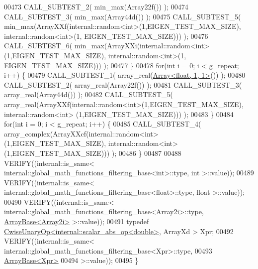 \begin{DoxyCode}
00473     CALL\_SUBTEST\_2( min\_max(Array22f()) );
00474     CALL\_SUBTEST\_3( min\_max(Array44d()) );
00475     CALL\_SUBTEST\_5( min\_max(ArrayXXf(internal::random<int>(1,EIGEN\_TEST\_MAX\_SIZE), internal::random<int>(1,
      EIGEN\_TEST\_MAX\_SIZE))) );
00476     CALL\_SUBTEST\_6( min\_max(ArrayXXi(internal::random<int>(1,EIGEN\_TEST\_MAX\_SIZE), internal::random<int>(1,
      EIGEN\_TEST\_MAX\_SIZE))) );
00477   \}
00478   \textcolor{keywordflow}{for}(\textcolor{keywordtype}{int} i = 0; i < g\_repeat; i++) \{
00479     CALL\_SUBTEST\_1( array\_real(\hyperlink{group___core___module_class_eigen_1_1_array}{Array<float, 1, 1>}()) );
00480     CALL\_SUBTEST\_2( array\_real(Array22f()) );
00481     CALL\_SUBTEST\_3( array\_real(Array44d()) );
00482     CALL\_SUBTEST\_5( array\_real(ArrayXXf(internal::random<int>(1,EIGEN\_TEST\_MAX\_SIZE), internal::random<int>
      (1,EIGEN\_TEST\_MAX\_SIZE))) );
00483   \}
00484   \textcolor{keywordflow}{for}(\textcolor{keywordtype}{int} i = 0; i < g\_repeat; i++) \{
00485     CALL\_SUBTEST\_4( array\_complex(ArrayXXcf(internal::random<int>(1,EIGEN\_TEST\_MAX\_SIZE), 
      internal::random<int>(1,EIGEN\_TEST\_MAX\_SIZE))) );
00486   \}
00487 
00488   VERIFY((internal::is\_same< internal::global\_math\_functions\_filtering\_base<int>::type, \textcolor{keywordtype}{int} >::value));
00489   VERIFY((internal::is\_same< internal::global\_math\_functions\_filtering\_base<float>::type, \textcolor{keywordtype}{float} >::value));
00490   VERIFY((internal::is\_same< internal::global\_math\_functions\_filtering\_base<Array2i>::type, 
      \hyperlink{group___core___module_class_eigen_1_1_array_base}{ArrayBase<Array2i>} >::value));
00491   \textcolor{keyword}{typedef} \hyperlink{group___core___module_class_eigen_1_1_cwise_unary_op}{CwiseUnaryOp<internal::scalar\_abs\_op<double>}, ArrayXd
       > Xpr;
00492   VERIFY((internal::is\_same< internal::global\_math\_functions\_filtering\_base<Xpr>::type,
00493                            \hyperlink{group___core___module_class_eigen_1_1_array_base}{ArrayBase<Xpr>}
00494                          >::value));
00495 \}
\end{DoxyCode}
